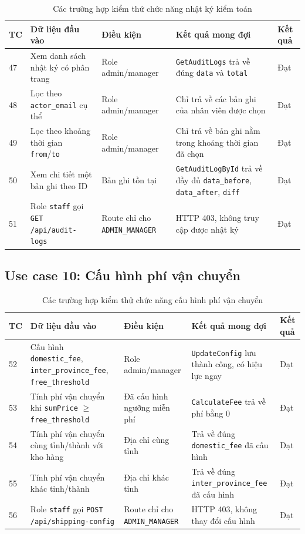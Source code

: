 \documentclass[../DoAn.tex]{subfiles}
\begin{document}
\begin{table}[H]
\centering
\caption{Các trường hợp kiểm thử chức năng nhật ký kiểm toán}
\label{tab:test-audit}
\scriptsize
\begin{tabular}{|p{0.5cm}|p{4.5cm}|p{3cm}|p{3.5cm}|p{1cm}|}
\hline
\textbf{TC} & \textbf{Dữ liệu đầu vào} & \textbf{Điều kiện} & \textbf{Kết quả mong đợi} & \textbf{Kết quả} \\
\hline
47 & Xem danh sách nhật ký có phân trang & Role admin/manager & \texttt{GetAuditLogs} trả về đúng \texttt{data} và \texttt{total} & Đạt \\
\hline
48 & Lọc theo \texttt{actor\_email} cụ thể & Role admin/manager & Chỉ trả về các bản ghi của nhân viên được chọn & Đạt \\
\hline
49 & Lọc theo khoảng thời gian \texttt{from}/\texttt{to} & Role admin/manager & Chỉ trả về bản ghi nằm trong khoảng thời gian đã chọn & Đạt \\
\hline
50 & Xem chi tiết một bản ghi theo ID & Bản ghi tồn tại & \texttt{GetAuditLogById} trả về đầy đủ \texttt{data\_before}, \texttt{data\_after}, \texttt{diff} & Đạt \\
\hline
51 & Role \texttt{staff} gọi \texttt{GET /api/audit-logs} & Route chỉ cho  \break \texttt{ADMIN\_MANAGER} & HTTP 403, không truy cập được nhật ký & Đạt \\
\hline
\end{tabular}
\end{table}

\subsection*{Use case 10: Cấu hình phí vận chuyển}

\begin{table}[H]
\centering
\caption{Các trường hợp kiểm thử chức năng cấu hình phí vận chuyển}
\label{tab:test-shipping}
\scriptsize
\begin{tabular}{|p{0.5cm}|p{4.5cm}|p{3cm}|p{3.5cm}|p{1cm}|}
\hline
\textbf{TC} & \textbf{Dữ liệu đầu vào} & \textbf{Điều kiện} & \textbf{Kết quả mong đợi} & \textbf{Kết quả} \\
\hline
52 & Cấu hình \texttt{domestic\_fee}, \texttt{inter\_province\_fee}, \texttt{free\_threshold} & Role admin/manager & \texttt{UpdateConfig} lưu thành công, có hiệu lực ngay & Đạt \\
\hline
53 & Tính phí vận chuyển khi \texttt{sumPrice} $\geq$ \texttt{free\_threshold} & Đã cấu hình ngưỡng miễn phí & \texttt{CalculateFee} trả về phí bằng 0 & Đạt \\
\hline
54 & Tính phí vận chuyển cùng tỉnh/thành với kho hàng & Địa chỉ cùng tỉnh & Trả về đúng \break \texttt{domestic\_fee} đã cấu hình & Đạt \\
\hline
55 & Tính phí vận chuyển khác tỉnh/thành & Địa chỉ khác tỉnh & Trả về đúng \break \texttt{inter\_province\_fee} đã cấu hình & Đạt \\
\hline
56 & Role \texttt{staff} gọi \texttt{POST /api/shipping-config} & Route chỉ cho \break \texttt{ADMIN\_MANAGER} & HTTP 403, không thay đổi cấu hình & Đạt \\
\hline
\end{tabular}
\end{table}
\end{document}
